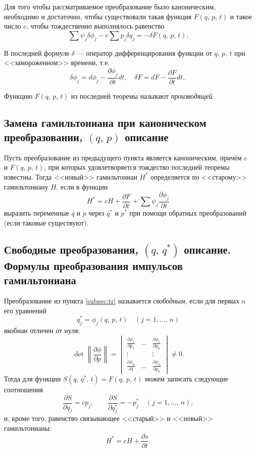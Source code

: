 \documentclass[a4paper,12pt]{article}
\begin{document}
\begin{thm}
	Для того чтобы рассматриваемое преобразование было каноническим,
	необходимо и достаточно, чтобы существовали такая функция 
	$F(q,\,p,\,t)$ и такое число $c$, чтобы тождественно выполнялось
	равенство
	\[
		\sum \psi_j \delta \phi_j -c \sum p_j \delta q_j=-\delta F(q,\,
		p,\,t)
	.\] 
\end{thm}
В последней формуле $\delta$ --- оператор дифференцирования функции от
$q,\,p,\,t$ при <<замороженном>> времени, т.\:е.
\[
\delta \phi_j =d \phi_j - \frac{\partial \phi_j}{\partial t} dt,\quad
\delta F=dF-\frac{\partial F}{\partial t} dt.
.\]
\begin{dfn}
	Функцию $F(q,\,p,\,t)$ из последней теоремы называют \emph{производящей}.
\end{dfn}
\subsection{Замена гамильтониана при каноническом преобразовании, $(q,\,p)$ 
описание}
\begin{thm}
Пусть преобразование из предыдущего пункта является каноническим, причём
$c$ и  $F(q,\,p,\,t)$, при которых удовлетворяется тождество последней
теоремы известны. Тогда <<новый>>  гамильтониан $H^*$ определяется по
<<старому>> гамильтониану $H$, если в функции
\[
H^*=cH+\frac{\partial F}{\partial t} +\sum \psi_j \frac{\partial \phi_j}{\partial t} 
\]
выразить переменные $q$ и $p$ через  $q^*$ и $p^*$ при помощи обратных
преобразований (если таковые существуют).
\end{thm}
\subsection{Свободные  преобразования, $(q,\,q^*)$ описание. Формулы
	преобразования
импульсов гамильтониана}
Преобразование из пункта \ref{subsec:tr} называется \emph{свободным}, если
для первых $n$ его уравнений
\[
	q^*_j=\phi_j(q,\,p,\,t) \quad (j=1,\ldots,\,n)
\]
якобиан отличен от нуля:
\[
\det \left\|\frac{\partial \phi}{\partial p} \right\|=
\begin{vmatrix}
	\frac{\partial \phi_1}{\partial p_1}  & \hdots & \frac{\partial \phi_1}{\partial p_n} \\
	\vdots & & \vdots\\
	\frac{\partial \phi_n}{\partial 1} & \hdots & \frac{\partial \phi_n}{\partial p_n} 
\end{vmatrix} \neq 0
.\] 
Тогда для функции $S(q,\,q^*,\,t)=F(q,\,p,\,t)$ можем записать следующие
соотношения
 \[
\frac{\partial S}{\partial q_j} =c p_j, \qquad \frac{\partial S}{\partial q_j^*} =
-p_j^* \quad (j=1,\ldots,\,n)
,\] 
и, кроме того, равенство связывающее <<старый>> и <<новый>> гамильтонианы:
\[
H^*=cH+\frac{\partial s}{\partial t} 
.\] 
\end{document}
